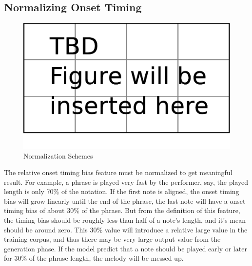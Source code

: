    \subsection{Normalizing Onset Timing}
\begin{figure}[tp]
   \begin{center}
      \includegraphics[width=\textwidth]{fig/TBDFigure}

   \end{center}
   \caption{Normalization Schemes}
   \label{fig:normalization}
\end{figure}
   The relative onset timing bias feature must be normalized to get meaningful result. For example, a phrase is played very fast by the performer, say, the played length is only 70\% of the notation. If the first note is aligned, the onset timing bias will grow linearly until the end of the phrase, the last note will have a onset timing bias of about 30\% of the phrase. But from the definition of this feature, the timing bias should be roughly less than half of  a note's length, and it's mean should be around zero. This 30\% value will introduce a relative large value in the training corpus, and thus there may be very large output value from the generation phase. If the model predict that a note should be played early or later for 30\% of the phrase length, the melody will be messed up. 

